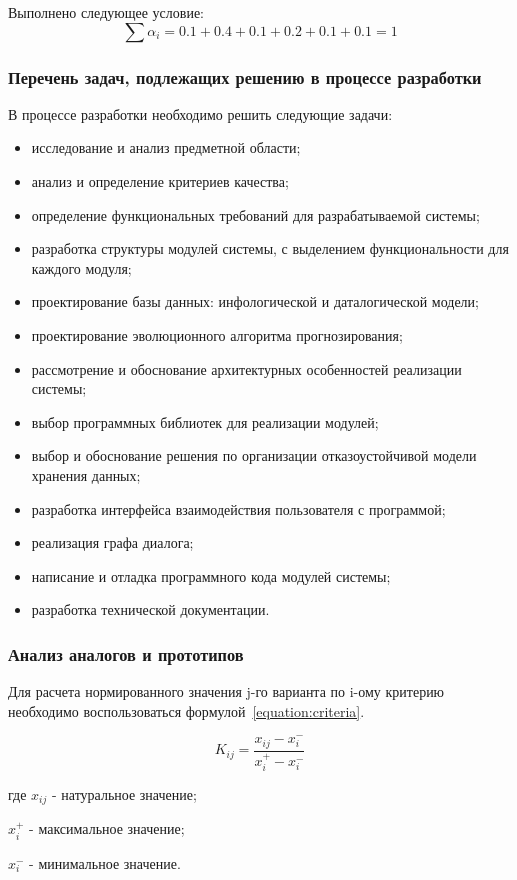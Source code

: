 Выполнено следующее условие:
\begin{equation}
\sum \alpha_i = 0.1 + 0.4 + 0.1 + 0.2 + 0.1 + 0.1 = 1
\end{equation}

\subsubsection{Перечень задач, подлежащих решению в процессе разработки}

В процессе разработки необходимо решить следующие задачи:
\begin{itemize}
\item исследование и анализ предметной области;
\item анализ и определение критериев качества;
\item определение функциональных требований для разрабатываемой системы;
\item разработка структуры модулей системы, с выделением функциональности для каждого модуля;
\item проектирование базы данных: инфологической и даталогической модели;
\item проектирование эволюционного алгоритма прогнозирования;
\item рассмотрение и обоснование архитектурных особенностей реализации системы;
\item выбор программных библиотек для реализации модулей;
\item выбор и обоснование решения по организации отказоустойчивой модели хранения данных;
\item разработка интерфейса взаимодействия пользователя с программой;
\item реализация графа диалога;
\item написание и отладка программного кода модулей системы;
\item разработка технической документации.
\end{itemize}

\subsubsection{Анализ аналогов и прототипов}

Для расчета нормированного значения j-го варианта по i-ому критерию необходимо
воспользоваться формулой~\ref{equation:criteria}.

\begin{equation}
\label{equation:criteria}
K_{ij} = \frac{x_{ij} - x_i^-}{x_i^+ - x_i^-}
\end{equation}
\begin{ESKDexplanation}
\item[где ] $x_{ij}$ - натуральное значение;
\item       $x_i^+$ - максимальное значение;
\item       $x_i^-$ - минимальное значение.
\end{ESKDexplanation}

